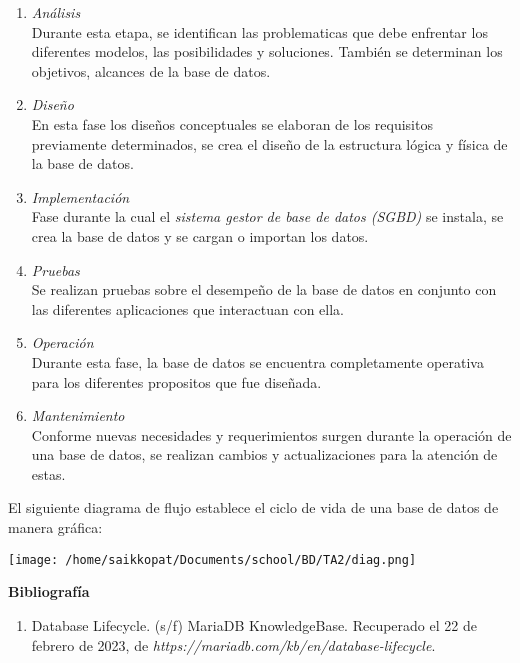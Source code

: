 \documentclass[a4paper,12pt]{report}
\begin{document}
\begin{enumerate}
	
	\item\emph{Análisis}\\Durante esta etapa, se identifican las problematicas que debe enfrentar los diferentes modelos, las posibilidades y soluciones. También se determinan los objetivos, alcances de la base de datos.\\

	\item\emph{Diseño}\\En esta fase los diseños conceptuales se elaboran de los requisitos previamente determinados, se crea el diseño de la estructura lógica y física de la base de datos.\\
	
	\item\emph{Implementación}\\Fase durante la cual el \emph{sistema gestor de base de datos (SGBD)} se instala, se crea la base de datos y se cargan o importan los datos.\\
	
	\item\emph{Pruebas}\\Se realizan pruebas sobre el desempeño de la base de datos en conjunto con las diferentes aplicaciones que interactuan con ella.\\
	
	\item\emph{Operación}\\Durante esta fase, la base de datos se encuentra completamente operativa para los diferentes propositos que fue diseñada.\\

	\item\emph{Mantenimiento}\\Conforme nuevas necesidades y requerimientos surgen durante la operación de una base de datos, se realizan cambios y actualizaciones para la atención de estas.\\
	
\end{enumerate}

El siguiente diagrama de flujo establece el ciclo de vida de una base de datos de manera gráfica:\\

\newpage

\centerline{%
\texttt{[image: /home/saikkopat/Documents/school/BD/TA2/diag.png]}%
				}

\newpage

\textbf{Bibliografía}

\begin{enumerate}
	\item Database Lifecycle. (s/f) MariaDB KnowledgeBase. Recuperado el 22 de febrero de 2023, de \emph{https://mariadb.com/kb/en/database-lifecycle}.
\end{enumerate}
\end{document}
